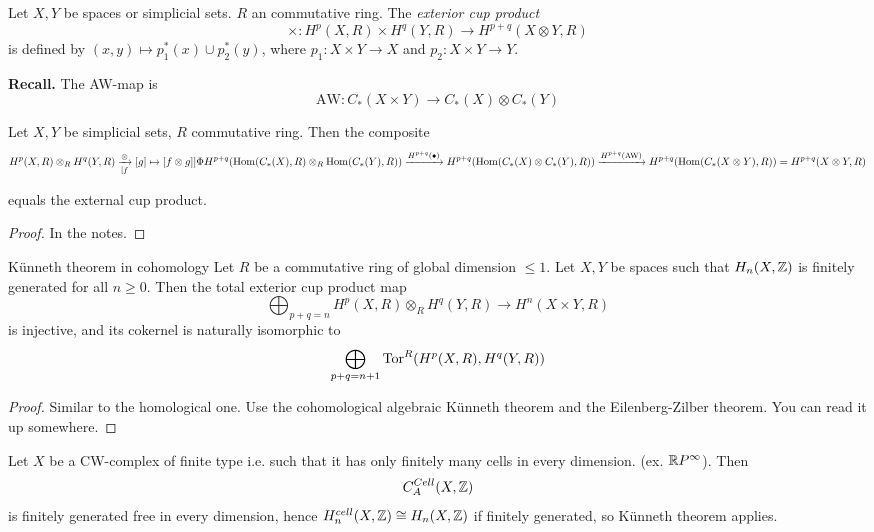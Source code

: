 \documentclass[language=english]{TemplateLecture}
\begin{document}
\begin{construction}
    Let \(X,Y\) be spaces or simplicial sets. \(R\) an commutative ring. The \emph{exterior cup product} 
    \[\times \colon H^p(X,R) \times H^q(Y,R) \to H^{p+q}(X\otimes Y, R)\]
    is defined by \((x,y) \mapsto p_1^*(x) \cup p_2^*(y)\), where \(p_1 \colon X\times Y \to X\) and \(p_2 \colon X \times Y \to Y\).
\end{construction}

\textbf{Recall.} The AW-map is
\[\mathrm{AW}\colon C_*(X\times Y) \to C_*(X) \otimes C_*(Y)\]

\begin{proposition}
    Let \(X, Y\) be simplicial sets, \(R\) commutative ring. Then the composite
    \[H^p(X,R) \otimes_R H^q(Y,R) \xrightarrow[[f]\otimes [g] \mapsto [f\otimes g]]{\Phi} H^{p+q}(\operatorname{Hom}(C_*(X) ,R) \otimes_R \operatorname{Hom}(C_*(Y),R)) \xrightarrow{H^{p+q}(\bullet)} H^{p+q} (\operatorname{Hom}(C_*(X) \otimes C_*(Y), R)) \xrightarrow{H^{p+q}(\mathrm{AW})} H^{p+q}(\operatorname{Hom}(C_*(X \otimes Y), R)) = H^{p+q}(X\otimes Y, R)\]

    equals the external cup product.
\end{proposition}

\begin{proof}
    In the notes.
\end{proof}


\begin{thm}{Künneth theorem in cohomology}{}
    Let \(R\) be a commutative ring of global dimension \(\leq 1\). Let \(X,Y\) be spaces such that \(H_n(X, \mathbb{Z})\) is finitely generated for all \(n \geq 0\). Then the total exterior cup product map
    \[\bigoplus_{p+q = n} H^p(X,R) \otimes_R H^q(Y,R) \to H^n(X \times Y, R)\]
    is injective, and its cokernel is naturally isomorphic to
    \[\bigoplus_{p+q = n+1} \mathrm{Tor}^R(H^p(X,R), H^q(Y,R))\]
\end{thm}

\begin{proof}
    Similar to the homological one. Use the cohomological algebraic Künneth theorem and the Eilenberg-Zilber theorem. You can read it up somewhere.
\end{proof}

\begin{remark}
    Let \(X\) be a CW-complex of finite type  i.e. such that it has only finitely many cells in every dimension. (ex. \(\mathbb{R} P ^\infty\)). Then
    \[C^{Cell}_A(X,\mathbb{Z})\]
    is finitely generated free in every dimension, hence \(H_n^{cell}(X,\mathbb{Z}) \cong H_n(X, \mathbb{Z})\) if finitely generated, so Künneth theorem applies.
\end{remark}
\end{document}
